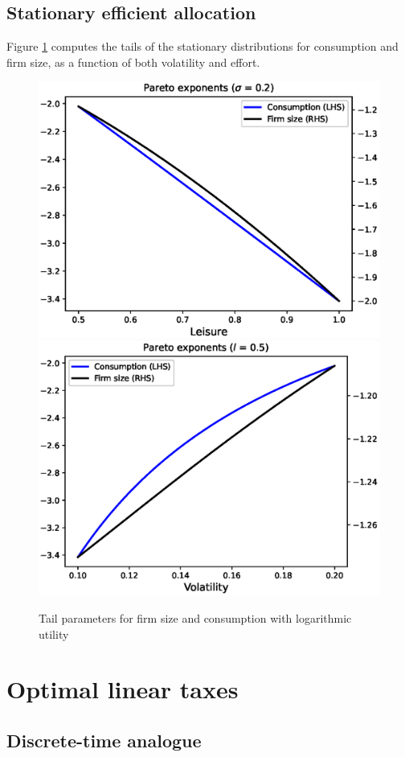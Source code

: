 \documentclass[11pt]{article}
\theoremstyle{plain}
\begin{document}
\subsection{Stationary efficient allocation}

Figure \ref{fig:tails_log} computes the tails of the stationary distributions for consumption and firm size, as a function of both volatility and effort. 

\begin{figure}[H]
\centering
\includegraphics[width=0.49\linewidth]{tails_log}
\includegraphics[width=0.49\linewidth]{tails_sig_log}
\caption{Tail parameters for firm size and consumption with logarithmic utility}\label{fig:tails_log}
\end{figure}
\fi

\section{Optimal linear taxes}

\subsection{Discrete-time analogue} \label{discCE} 
\end{document}
